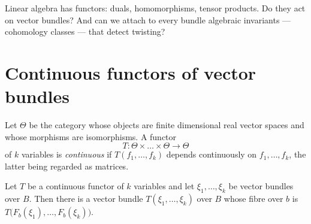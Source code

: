 \lecture

\begin{guiding}
Linear algebra has functors: duals, homomorphisms, tensor products. Do they act
on vector bundles? And can we attach to every bundle algebraic invariants ---
cohomology classes --- that detect twisting?
\end{guiding}

\section{Continuous functors of vector bundles}

\begin{definition}
Let $\Theta$ be the category whose objects are finite dimensional real vector
spaces and whose morphisms are isomorphisms. A functor
\[
T\colon \Theta\times\dots\times\Theta\longrightarrow\Theta
\]
of $k$ variables is \emph{continuous} if $T(f_1,\dots,f_k)$ depends continuously
on $f_1,\dots,f_k$, the latter being regarded as matrices.
\end{definition}

\begin{theorem}\label{thm:functor-bundle}
Let $T$ be a continuous functor of $k$ variables and let $\xi_1,\dots,\xi_k$ be
vector bundles over $B$. Then there is a vector bundle
$T(\xi_1,\dots,\xi_k)$ over $B$ whose fibre over $b$ is
$T\big(F_b(\xi_1),\dots,F_b(\xi_k)\big)$.
\end{theorem}

